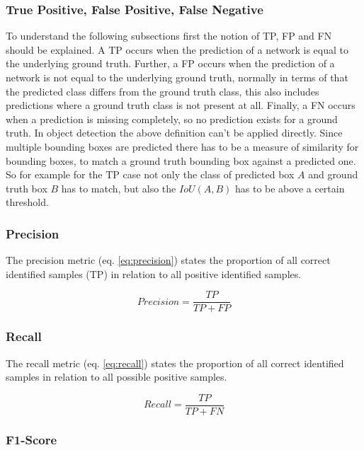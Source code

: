 \subsubsection{True Positive, False Positive, False Negative}
\label{sec:tpfpfn}

To understand the following subsections first the notion of \ac{TP}, \ac{FP} and \ac{FN} should be explained.
A \ac{TP} occurs when the prediction of a network is equal to the underlying ground truth.
Further, a \ac{FP} occurs when the prediction of a network is not equal to the underlying ground truth, normally in terms of that the predicted class differs from the ground truth class, this also includes predictions where a ground truth class is not present at all.
Finally, a \ac{FN} occurs when a prediction is missing completely, so no prediction exists for a ground truth.
In object detection the above definition can't be applied directly.
Since multiple bounding boxes are predicted there has to be a measure of similarity for bounding boxes, to match a ground truth bounding box against a predicted one.
So for example for the \ac{TP} case not only the class of predicted box $A$ and ground truth box $B$ has to match, but also the $IoU(A, B)$ has to be above a certain threshold.

\subsubsection{Precision}

The precision metric (eq. \ref{eq:precision}) states the proportion of all correct identified samples (\ac{TP}) in relation to all positive identified samples.

\begin{equation}
    Precision = \frac{TP}{TP + FP}
    \label{eq:precision}
\end{equation}

\subsubsection{Recall}

The recall metric (eq. \ref{eq:recall}) states the proportion of all correct identified samples in relation to all possible positive samples.

\begin{equation}
    Recall = \frac{TP}{TP + FN}
    \label{eq:recall}
\end{equation}

\subsubsection{F1-Score}


